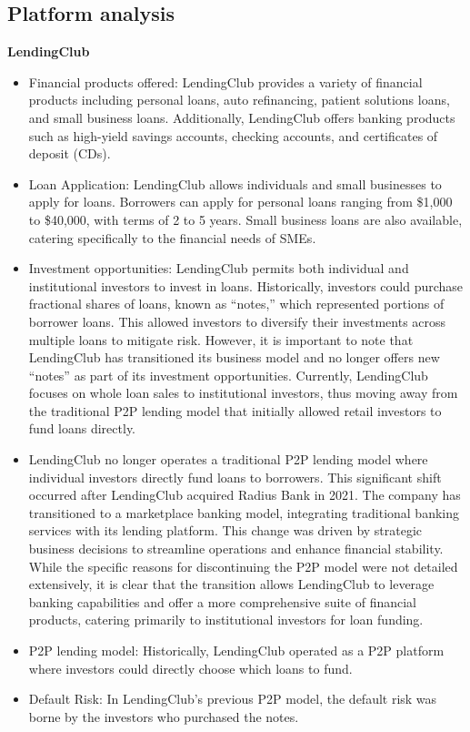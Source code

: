 \documentclass[pdflatex,sn-apa]{sn-jnl}%
\theoremstyle{thmstyleone}%
\theoremstyle{thmstyletwo}%
\theoremstyle{thmstylethree}%
\begin{document}
\subsection{Platform analysis}
\textbf{LendingClub} 
\begin{itemize} 
\item Financial products offered: LendingClub provides a variety of financial products including personal loans, auto refinancing, patient solutions loans, and small business loans. Additionally, LendingClub offers banking products such as high-yield savings accounts, checking accounts, and certificates of deposit (CDs). 
\item Loan Application: LendingClub allows individuals and small businesses to apply for loans. Borrowers can apply for personal loans ranging from \$1,000 to \$40,000, with terms of 2 to 5 years. Small business loans are also available, catering specifically to the financial needs of SMEs. 
\item Investment opportunities: LendingClub permits both individual and institutional investors to invest in loans. Historically, investors could purchase fractional shares of loans, known as “notes,” which represented portions of borrower loans. This allowed investors to diversify their investments across multiple loans to mitigate risk. However, it is important to note that LendingClub has transitioned its business model and no longer offers new “notes” as part of its investment opportunities. Currently, LendingClub focuses on whole loan sales to institutional investors, thus moving away from the traditional P2P lending model that initially allowed retail investors to fund loans directly. 
\item LendingClub no longer operates a traditional P2P lending model where individual investors directly fund loans to borrowers. This significant shift occurred after LendingClub acquired Radius Bank in 2021. The company has transitioned to a marketplace banking model, integrating traditional banking services with its lending platform. This change was driven by strategic business decisions to streamline operations and enhance financial stability. While the specific reasons for discontinuing the P2P model were not detailed extensively, it is clear that the transition allows LendingClub to leverage banking capabilities and offer a more comprehensive suite of financial products, catering primarily to institutional investors for loan funding. 
\item P2P lending model: Historically, LendingClub operated as a P2P platform where investors could directly choose which loans to fund. 
\item Default Risk: In LendingClub’s previous P2P model, the default risk was borne by the investors who purchased the notes. 
\end{itemize}
\end{document}

